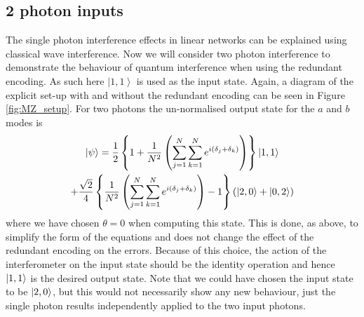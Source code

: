 \documentclass[aps,pra,twocolumn,superscriptaddress,numerical,floatfix]{revtex4-1}
\begin{document}
\subsection{2 photon inputs\label{2 photons N arbitrary}}

The single photon interference effects in linear networks can be explained using classical wave interference.  Now we will consider two photon interference to demonstrate the behaviour of quantum interference when using the redundant encoding. As such here $\left|1,1\right\rangle$ is used as the input state. Again, a diagram of the explicit set-up with and without the redundant encoding can be seen in Figure \ref{fig:MZ_setup}. For two photons the un-normalised output state for the $a$ and $b$ modes is
\begin{multline}
	\ket{\psi} =  \frac{1}{2}\left\{ 1+\frac{1}{N^{2}}\left(\sum_{j=1}^{N}\sum_{k=1}^{N}e^{i(\delta_{j}+\delta_{k})}\right)\right\} \ket{1,1} \\
	+\frac{\sqrt{2}}{4}\left\{ \frac{1}{N^{2}}\left(\sum_{j=1}^{N}\sum_{k=1}^{N}e^{i(\delta_{j}+\delta_{k})}\right)-1\right\} \left(\ket{2,0} +\ket{0,2}\right)\label{eq:2pNarbitrary S}
\end{multline}
where we have chosen $\theta=0$ when computing this state. This is done, as above, to simplify the form of the equations and does not change the effect of the redundant encoding on the errors.  Because of this choice, the action of the interferometer on the input state should be the identity operation and hence $\ket{1,1}$ is the desired output state.   Note that we could have chosen the input state to be $\ket{2,0}$, but this would not necessarily show any new behaviour, just the single photon results independently applied to the two input photons. 
\end{document}
